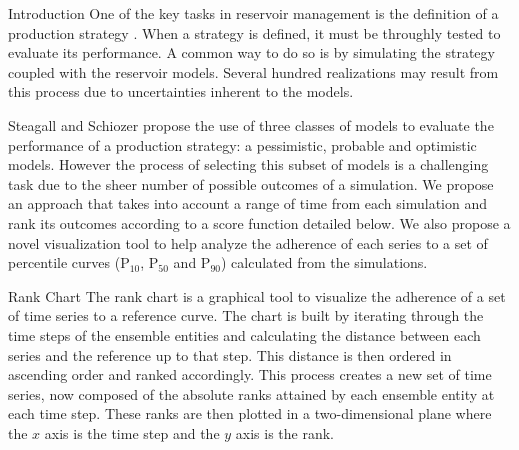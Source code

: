 \documentclass[final]{beamer}
\newlength{\twocolwid}
\begin{document}
\begin{frame}[t]
\begin{columns}[t]
\begin{column}{\twocolwid}
\begin{block}{Introduction}
One of the key tasks in reservoir management is the definition of a production strategy \cite{schiozer:2004}. When a strategy is defined, it must be throughly tested to evaluate its performance. A common way to do so is by simulating the strategy coupled with the reservoir models. Several hundred realizations may result from this process due to uncertainties inherent to the models.

Steagall and Schiozer \cite{steagall:2001} propose the use of three classes of models to evaluate the performance of a production strategy: a pessimistic, probable and optimistic models. However the process of selecting this subset of models is a challenging task due to the sheer number of possible outcomes of a simulation. We propose an approach that takes into account a range of time from each simulation and rank its outcomes according to a score function detailed below. We also propose a novel visualization tool to help analyze the adherence of each series to a set of percentile curves (P$_{10}$, P$_{50}$ and P$_{90}$) calculated from the simulations.

\end{block}



\begin{block}{Rank Chart}
The rank chart is a graphical tool to visualize the adherence of a set of time series to a reference curve. The chart is built by iterating through the time steps of the ensemble entities and calculating the distance between each series and the reference up to that step. This distance is then ordered in ascending order and ranked accordingly. This process creates a new set of time series, now composed of the absolute ranks attained by each ensemble entity at each time step. These ranks are then plotted in a two-dimensional plane where the $x$ axis is the time step and the $y$ axis is the rank.
\end{block}


\end{column}
\end{columns}
\end{frame}
\end{document}
